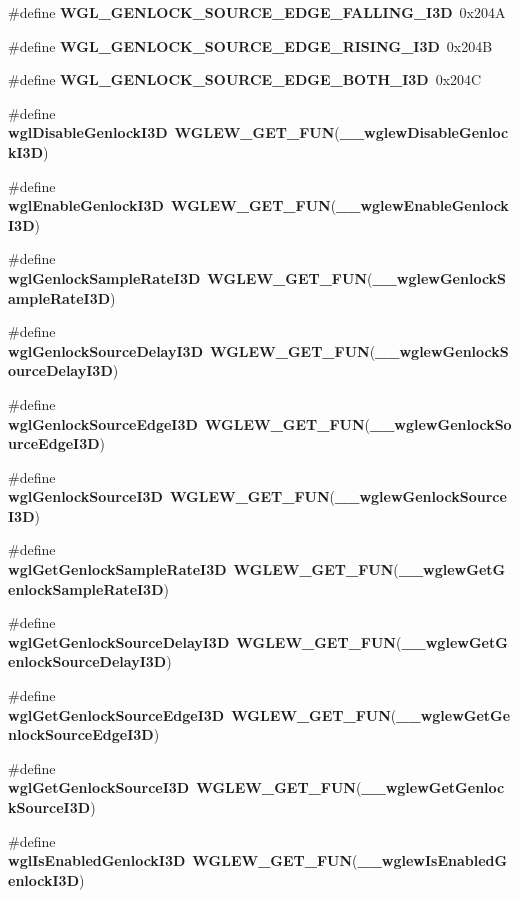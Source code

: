 \begin{DoxyCompactItemize}
\item 
\#define {\bf W\+G\+L\+\_\+\+G\+E\+N\+L\+O\+C\+K\+\_\+\+S\+O\+U\+R\+C\+E\+\_\+\+E\+D\+G\+E\+\_\+\+F\+A\+L\+L\+I\+N\+G\+\_\+\+I3D}~0x204A
\item 
\#define {\bf W\+G\+L\+\_\+\+G\+E\+N\+L\+O\+C\+K\+\_\+\+S\+O\+U\+R\+C\+E\+\_\+\+E\+D\+G\+E\+\_\+\+R\+I\+S\+I\+N\+G\+\_\+\+I3D}~0x204B
\item 
\#define {\bf W\+G\+L\+\_\+\+G\+E\+N\+L\+O\+C\+K\+\_\+\+S\+O\+U\+R\+C\+E\+\_\+\+E\+D\+G\+E\+\_\+\+B\+O\+T\+H\+\_\+\+I3D}~0x204C
\item 
\#define {\bf wgl\+Disable\+Genlock\+I3D}~{\bf W\+G\+L\+E\+W\+\_\+\+G\+E\+T\+\_\+\+F\+UN}({\bf \+\_\+\+\_\+wglew\+Disable\+Genlock\+I3D})
\item 
\#define {\bf wgl\+Enable\+Genlock\+I3D}~{\bf W\+G\+L\+E\+W\+\_\+\+G\+E\+T\+\_\+\+F\+UN}({\bf \+\_\+\+\_\+wglew\+Enable\+Genlock\+I3D})
\item 
\#define {\bf wgl\+Genlock\+Sample\+Rate\+I3D}~{\bf W\+G\+L\+E\+W\+\_\+\+G\+E\+T\+\_\+\+F\+UN}({\bf \+\_\+\+\_\+wglew\+Genlock\+Sample\+Rate\+I3D})
\item 
\#define {\bf wgl\+Genlock\+Source\+Delay\+I3D}~{\bf W\+G\+L\+E\+W\+\_\+\+G\+E\+T\+\_\+\+F\+UN}({\bf \+\_\+\+\_\+wglew\+Genlock\+Source\+Delay\+I3D})
\item 
\#define {\bf wgl\+Genlock\+Source\+Edge\+I3D}~{\bf W\+G\+L\+E\+W\+\_\+\+G\+E\+T\+\_\+\+F\+UN}({\bf \+\_\+\+\_\+wglew\+Genlock\+Source\+Edge\+I3D})
\item 
\#define {\bf wgl\+Genlock\+Source\+I3D}~{\bf W\+G\+L\+E\+W\+\_\+\+G\+E\+T\+\_\+\+F\+UN}({\bf \+\_\+\+\_\+wglew\+Genlock\+Source\+I3D})
\item 
\#define {\bf wgl\+Get\+Genlock\+Sample\+Rate\+I3D}~{\bf W\+G\+L\+E\+W\+\_\+\+G\+E\+T\+\_\+\+F\+UN}({\bf \+\_\+\+\_\+wglew\+Get\+Genlock\+Sample\+Rate\+I3D})
\item 
\#define {\bf wgl\+Get\+Genlock\+Source\+Delay\+I3D}~{\bf W\+G\+L\+E\+W\+\_\+\+G\+E\+T\+\_\+\+F\+UN}({\bf \+\_\+\+\_\+wglew\+Get\+Genlock\+Source\+Delay\+I3D})
\item 
\#define {\bf wgl\+Get\+Genlock\+Source\+Edge\+I3D}~{\bf W\+G\+L\+E\+W\+\_\+\+G\+E\+T\+\_\+\+F\+UN}({\bf \+\_\+\+\_\+wglew\+Get\+Genlock\+Source\+Edge\+I3D})
\item 
\#define {\bf wgl\+Get\+Genlock\+Source\+I3D}~{\bf W\+G\+L\+E\+W\+\_\+\+G\+E\+T\+\_\+\+F\+UN}({\bf \+\_\+\+\_\+wglew\+Get\+Genlock\+Source\+I3D})
\item 
\#define {\bf wgl\+Is\+Enabled\+Genlock\+I3D}~{\bf W\+G\+L\+E\+W\+\_\+\+G\+E\+T\+\_\+\+F\+UN}({\bf \+\_\+\+\_\+wglew\+Is\+Enabled\+Genlock\+I3D})

\end{DoxyCompactItemize}
